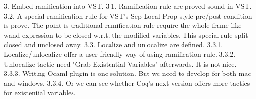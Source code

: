 3. Embed ramification into VST.
3.1. Ramification rule are proved sound in VST.
3.2. A special ramification rule for VST's Sep-Local-Prop style pre/post condition is prove. The point is traditional ramification rule require the whole frame-like-wand-expression to be closed w.r.t. the modified variables. This special rule split closed and unclosed away.
3.3. Localize and unlocalize are defined.
3.3.1. Localize/unlocalize offer a user-friendly way of using ramification rule.
3.3.2. Unlocalize tactic need "Grab Existential Variables" afterwards. It is not nice.
3.3.3. Writing Ocaml plugin is one solution. But we need to develop for both mac and windows.
3.3.4. Or we can see whether Coq's next version offers more tactics for existential variables.
